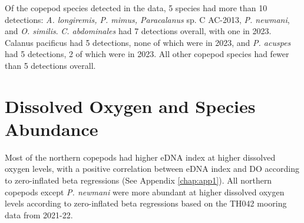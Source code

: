 \documentclass[12pt,twoside]{reedthesis}
\begin{document}
	Of the copepod species detected in the data, 5 species had more than 10 detections: \textit{A. longiremis, P. mimus, Paracalanus} sp. C AC-2013, \textit{P. newmani}, and \textit{O. similis}. \textit{C. abdominales} had 7 detections overall, with one in 2023. Calanus pacificus had 5 detections, none of which were in 2023, and \textit{P. acuspes} had 5 detections, 2 of which were in 2023. All other copepod species had fewer than 5 detections overall.
	
	
	
	
	
	\section{Dissolved Oxygen and Species Abundance}  
	
	Most of the northern copepods had higher eDNA index at higher dissolved oxygen levels, with a positive correlation between eDNA index and DO according to zero-inflated beta regressions (See Appendix \ref{chap:app1}). All northern copepods except \textit{P. newmani} were more abundant at higher dissolved oxygen levels according to zero-inflated beta regressions based on the TH042 mooring data from 2021-22. 
	
\end{document}
